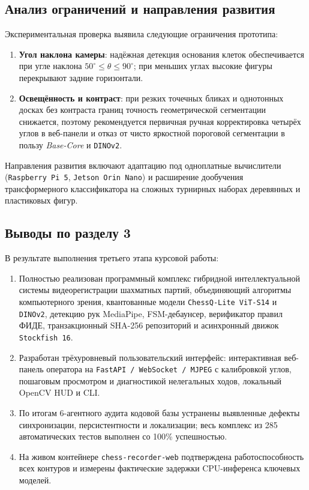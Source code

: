 \subsection{Анализ ограничений и направления развития}

Экспериментальная проверка выявила следующие ограничения прототипа:
\begin{enumerate}
    \item \textbf{Угол наклона камеры}: надёжная детекция основания клеток обеспечивается при угле наклона $50^\circ \le \theta \le 90^\circ$; при меньших углах высокие фигуры перекрывают задние горизонтали.
    \item \textbf{Освещённость и контраст}: при резких точечных бликах и однотонных досках без контраста границ точность геометрической сегментации снижается, поэтому рекомендуется первичная ручная корректировка четырёх углов в веб-панели и отказ от чисто яркостной пороговой сегментации в пользу \textit{Base-Core} и \texttt{DINOv2}.
\end{enumerate}

Направления развития включают адаптацию под одноплатные вычислители (\texttt{Raspberry~Pi~5}, \texttt{Jetson~Orin~Nano}) и расширение дообучения трансформерного классификатора на сложных турнирных наборах деревянных и пластиковых фигур.

\subsection{Выводы по разделу 3}

В результате выполнения третьего этапа курсовой работы:
\begin{enumerate}
    \item Полностью реализован программный комплекс гибридной интеллектуальной системы видеорегистрации шахматных партий, объединяющий алгоритмы компьютерного зрения, квантованные модели \texttt{ChessQ-Lite ViT-S14} и \texttt{DINOv2}, детекцию рук MediaPipe, FSM-дебаунсер, верификатор правил ФИДЕ, транзакционный SHA-256 репозиторий и асинхронный движок \texttt{Stockfish~16}.
    \item Разработан трёхуровневый пользовательский интерфейс: интерактивная веб-панель оператора на \texttt{FastAPI / WebSocket / MJPEG} с калибровкой углов, пошаговым просмотром и диагностикой нелегальных ходов, локальный OpenCV HUD и CLI.
    \item По итогам 6-агентного аудита кодовой базы устранены выявленные дефекты синхронизации, персистентности и локализации; весь комплекс из 285 автоматических тестов выполнен со 100\% успешностью.
    \item На живом контейнере \texttt{chess-recorder-web} подтверждена работоспособность всех контуров и измерены фактические задержки CPU-инференса ключевых моделей.
\end{enumerate}
